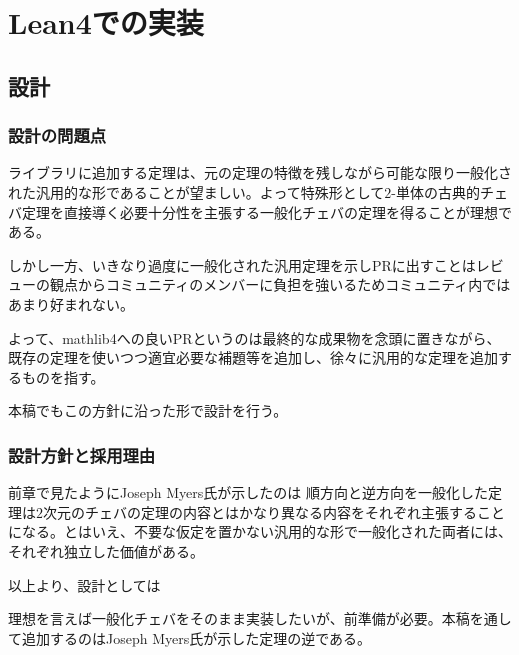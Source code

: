 \documentclass[a4paper,12pt]{bxjsbook}
\newlength{\customindent}
\newenvironment{body}{
  \par
  \begingroup
  \setlength{\leftskip}{\customindent}
  \setlength{\rightskip}{0pt}
  \setlength{\parindent}{1em}
  \setlength{\displayindent}{\customindent}
  \setlength{\displaywidth}{\dimexpr\linewidth-\customindent\relax}
}{
  \par
  \endgroup
}
\theoremstyle{theorem}
\begin{document}
    \chapter{Lean4での実装}

    \section{設計}
    \subsection{設計の問題点}
    \begin{body}
        \indent ライブラリに追加する定理は、元の定理の特徴を残しながら可能な限り一般化された汎用的な形であることが望ましい。よって特殊形として$2$-単体の古典的チェバ定理を直接導く必要十分性を主張する一般化チェバの定理を得ることが理想である。

        \indent しかし一方、いきなり過度に一般化された汎用定理を示しPRに出すことはレビューの観点からコミュニティのメンバーに負担を強いるためコミュニティ内ではあまり好まれない。

        \indent よって、mathlib4への良いPRというのは最終的な成果物を念頭に置きながら、既存の定理を使いつつ適宜必要な補題等を追加し、徐々に汎用的な定理を追加するものを指す。

        \indent 本稿でもこの方針に沿った形で設計を行う。

    \end{body}

    \subsection{設計方針と採用理由}
    \begin{body}
        \indent 前章で見たようにJoseph Myers氏が示したのは
        \indent 順方向と逆方向を一般化した定理は$2$次元のチェバの定理の内容とはかなり異なる内容をそれぞれ主張することになる。とはいえ、不要な仮定を置かない汎用的な形で一般化された両者には、それぞれ独立した価値がある。

        \indent 以上より、設計としては

        \indent 理想を言えば一般化チェバをそのまま実装したいが、前準備が必要。本稿を通して追加するのはJoseph Myers氏が示した定理の逆である。

    \end{body}
\end{document}
